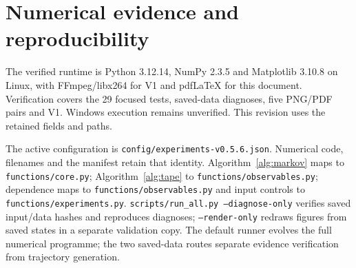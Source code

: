 \documentclass[11pt,a4paper]{article}
\begin{document}
\section{Numerical evidence and reproducibility}
The verified runtime is Python 3.12.14, NumPy 2.3.5 and Matplotlib 3.10.8 on Linux, with FFmpeg/libx264 for V1 and pdfLaTeX for this document. Verification covers the 29 focused tests, saved-data diagnoses, five PNG/PDF pairs and V1. Windows execution remains unverified. This revision uses the retained fields and paths.

The active configuration is \texttt{config/}\allowbreak\texttt{experiments-v0.5.6.json}. Numerical code, filenames and the manifest retain that identity. Algorithm~\ref{alg:markov} maps to \texttt{functions/core.py}; Algorithm~\ref{alg:tape} to \texttt{functions/}\allowbreak\texttt{observables.py}; dependence maps to \texttt{functions/observables.py} and input controls to \texttt{functions/experiments.py}. \texttt{scripts/run\_all.py --diagnose-only} verifies saved input/data hashes and reproduces diagnoses; \texttt{--render-only} redraws figures from saved states in a separate validation copy. The default runner evolves the full numerical programme; the two saved-data routes separate evidence verification from trajectory generation.
\end{document}
